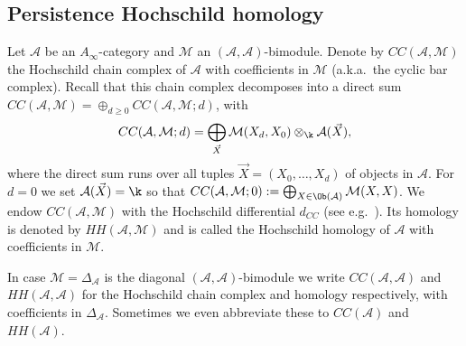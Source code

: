 \subsection{Persistence Hochschild homology}\label{app:PHH}
Let $\mathcal{A}$ be an $A_{\infty}$-category and $\mathcal{M}$ an
$(\mathcal{A}, \mathcal{A})$-bimodule. Denote by
$CC(\mathcal{A}, \mathcal{M})$ the Hochschild chain complex of
$\mathcal{A}$ with coefficients in $\mathcal{M}$ (a.k.a.~the cyclic
bar complex). Recall that this chain complex decomposes into a direct
sum
$CC(\mathcal{A}, \mathcal{M}) = \oplus_{d \geq 0} CC(\mathcal{A},
\mathcal{M}; d)$, with
$$CC(\mathcal{A}, \mathcal{M}; d) = \bigoplus_{\vec{X}}
\mathcal{M}(X_d,X_0) \otimes_{\k} \mathcal{A}(\vec{X}) ,$$ where the
direct sum runs over all tuples $\vec{X} = (X_0, \ldots, X_d)$ of
objects in $\mathcal{A}$. For $d=0$ we set $\mathcal{A}(\vec{X}) = \k$
so that
$CC(\mathcal{A}, \mathcal{M}; 0) := \bigoplus_{X \in \Ob(\mathcal{A})}
\mathcal{M}(X,X)$. We endow $CC(\mathcal{A}, \mathcal{M})$ with
the Hochschild differential $d_{CC}$ (see e.g.~\cite{Gan:thesis,
  Sher:form-hodge, Ri-Sm:WF-OC}). Its homology is denoted by
$HH(\mathcal{A}, \mathcal{M})$ and is called the Hochschild homology
of $\mathcal{A}$ with coefficients in $\mathcal{M}$.

In case $\mathcal{M} = \Delta_{\mathcal{A}}$ is the diagonal
$(\mathcal{A}, \mathcal{A})$-bimodule we write
$CC(\mathcal{A}, \mathcal{A})$ and $HH(\mathcal{A}, \mathcal{A})$ for
the Hochschild chain complex and homology respectively, with
coefficients in $\Delta_{\mathcal{A}}$. Sometimes we even abbreviate these to $CC(\mathcal{A})$ and $HH(\mathcal{A})$.

